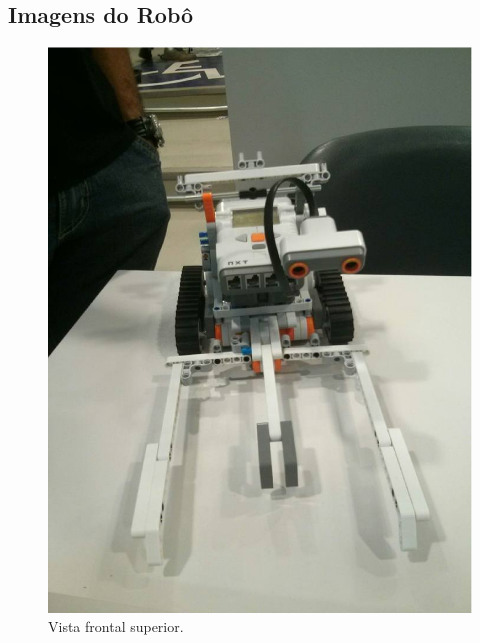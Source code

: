 \begin{apendicesenv}

\partapendices

\chapter{Imagens do Robô}
\label{imagens}

\begin{figure}[h]
    \centering
    \includegraphics[keepaspectratio=true,scale=0.55]
      {figuras/robo_001.eps}
    \caption{Vista frontal superior.}
\end{figure}


\end{apendicesenv}
